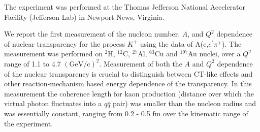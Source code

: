 %
The experiment was performed at the Thomas Jefferson National Accelerator Facility (Jefferson Lab) in Newport News, Virginia.

%
%
We report the first measurement of the nucleon number, $A$, and $Q^2$ dependence of nuclear transparency for the process $K^+$ using the data of A(e,$e^\prime \pi^+$). The measurement was performed on $^{2}$H, $^{12}$C, $^{27}$Al, $^{63}$Cu and $^{197}$Au nuclei, over a  $Q^2$ range of 1.1 $\mathrm{to}$ 4.7 $(\mathrm{GeV/c})^2$. Measurement of both the $A$ and $Q^2$ dependence of the nuclear transparency is crucial to distinguish between CT-like effects and other reaction-mechanism based energy dependence of the transparency. In this measurement the coherence length for kaon production (distance over which the virtual photon fluctuates into a $q\bar{q}$ pair) was smaller than the nucleon radius and was essentially constant, ranging from 0.2 - 0.5 fm over the kinematic range of the experiment.


